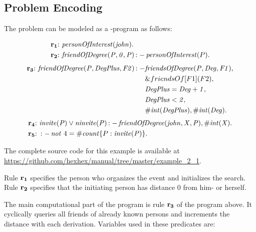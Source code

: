 \documentclass[a4paper, titlepage]{article}
\newcommand{\ext}[3]{\ensuremath{\&{#1}[#2](#3)}}
\DeclareMathOperator{\leftimpl}{:-}
\DeclareMathOperator{\nott}{\mathit{not}}
\newcommand{\examplelink}[1]{\url{https://github.com/hexhex/manual/tree/master/#1}}
\newcommand{\row}[1]{%
  \ensuremath{\color{black}\ensuremath{\mathbf{#1}} \color{black}}%
}
\newcommand{\rowprefix}[1]{%
  \ensuremath{\color{black}\mathbf{#1{:}}\ }%
}
\begin{document}
\subsection{Problem Encoding}
The problem can be modeled as a \hex{}-program as follows:
\begin{exmp}
\label{faceQuery}
\begin{align*}
\rowprefix{r_1}& \mathit{personOfInterest}(\mathit{john}). \\
\rowprefix{r_2} & \mathit{friendOfDegree}(\mathit{P, 0, P}) 
\leftimpl  \mathit{personOfInterest}(P).\\
\end{align*}
\begin{align*}
\rowprefix{r_3} \mathit{friendOfDegree}(\mathit{P, DegPlus, 
F2}) \leftimpl 
& \mathit{friendsOfDegree}(\mathit{P,Deg,F1)},\\
& \ext{friendsOf}{F1}{F2},\\ 
& \mathit{DegPlus = Deg + 1}, \\
& \mathit{DegPlus < 2},\\
& \mathit{\#int(DegPlus)}, \mathit{\#int(Deg)}.\\
\end{align*}
\begin{align*}
\rowprefix{r_4} & \mathit{invite(P)} \vee \mathit{ninvite(P) 
\leftimpl  friendOfDegree(john,X,P), \#int(X).}\\
\rowprefix{r_5} & \leftimpl \nott \thinspace 4 = \mathit{\#count} 
\{ P : \mathit{invite(P)} \}. \\
\end{align*}
\end{exmp}
The complete source code for this example is available at \examplelink{example_2_1}.

Rule $\row{r_1}$ specifies the person who organizes the event 
and initializes the search. Rule $\row{r_2}$ specifies that the initiating person has 
distance 0 from him- or herself. 

The main computational part of the program is rule $\row{r_3}$ of 
the program above. It cyclically queries all  friends of 
already known persons and increments the distance with each 
derivation. Variables used in these predicates are: 
\end{document}
